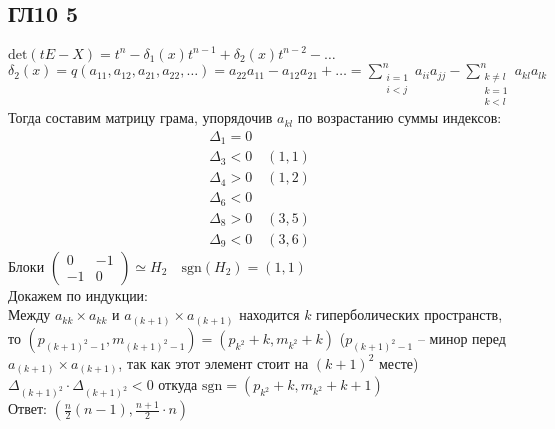 \subsection*{ГЛ10 5}
$\text{det}(tE - X) = t^n - \delta_1(x)t^{n-1} + \delta_2(x)t^{n-2} - \ldots$\\
$\delta_2(x) = q(a_{11},a_{12},a_{21},a_{22},\ldots) = a_{22}a_{11} - a_{12}a_{21} + \ldots = \sum\limits^{n}_{\substack{i = 1\\ i<j}}a_{ii}a_{jj} - \sum\limits^{n}_{\substack{k \ne l\\ k = 1\\ k < l}}a_{kl}a_{lk}$\\
Тогда составим матрицу грама, упорядочив $a_{kl}$ по возрастанию суммы индексов:
\begin{gather*}
	\Delta_{1} = 0\\
	\Delta_{3} < 0\quad (1,1)\\
	\Delta_{4} > 0\quad (1,2)\\
	\Delta_{6} < 0\\
	\Delta_{8} > 0\quad (3,5)\\
	\Delta_{9} < 0\quad (3,6)
\end{gather*}
Блоки $\begin{pmatrix} 0 & -1\\ -1 & 0 \end{pmatrix} \simeq H_2\quad \text{sgn}(H_2) = (1,1)$\\
Докажем по индукции:\\
Между $a_{kk} \times a_{kk}$ и $a_{(k+1)} \times a_{(k+1)}$ находится $k$ гиперболических пространств, то $(p_{(k+1)^2-1}, m_{(k+1)^2-1}) = (p_{k^2} + k, m_{k^2} + k)$ ($p_{(k+1)^2-1}$ -- минор перед $a_{(k+1)} \times a_{(k+1)}$, так как этот элемент стоит на $(k+1)^2$ месте)\\
$\Delta_{(k+1)^2} \cdot \Delta_{(k+1)^2} < 0$ откуда $\text{sgn} = (p_{k^2}+k, m_{k^2}+k+1)$\\
Ответ: $(\frac{n}{2}(n-1), \frac{n+1}{2}\cdot n)$\\
		